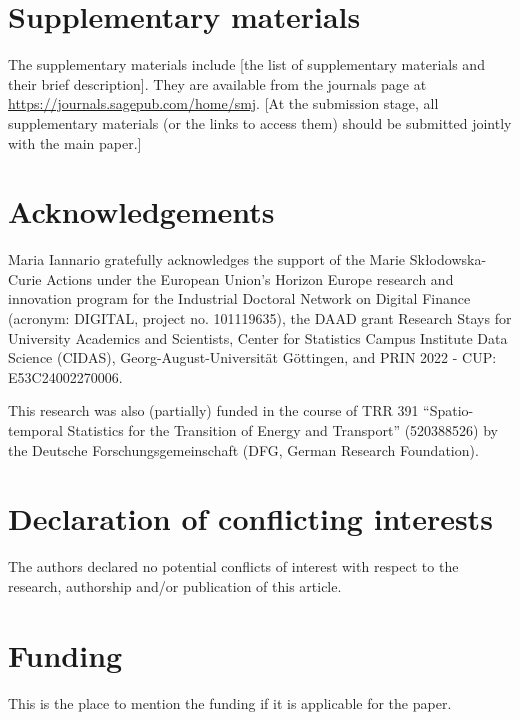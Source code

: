 \documentclass[submit]{smj}
\begin{document}
\section*{Supplementary materials}
The supplementary materials include [the list of supplementary materials and their brief description]. They are available from the journals page at \url{https://journals.sagepub.com/home/smj}. [At the submission stage, all supplementary materials (or the links to access them) should be submitted jointly with the main paper.]

\section*{Acknowledgements}

Maria Iannario gratefully acknowledges the support of the Marie Sk\l odowska-Curie Actions under the European Union's Horizon Europe research and innovation program for the Industrial Doctoral Network on Digital Finance (acronym: DIGITAL, project no. 101119635), the DAAD grant Research Stays for University Academics and Scientists, Center for Statistics Campus Institute Data Science (CIDAS), Georg-August-Universit\"at G\"ottingen, and PRIN 2022 - CUP: E53C24002270006. 

This research was also (partially) funded in the course of TRR 391 \enquote{Spatio-temporal Statistics for the Transition of Energy and Transport} (520388526) by the Deutsche Forschungsgemeinschaft (DFG, German Research Foundation).

\section*{Declaration of conflicting interests}
The authors declared no potential conflicts of interest with respect to the research, authorship and/or
publication of this article.

\section*{Funding}
This is the place to mention the funding if it is applicable for the paper.
\end{document}
